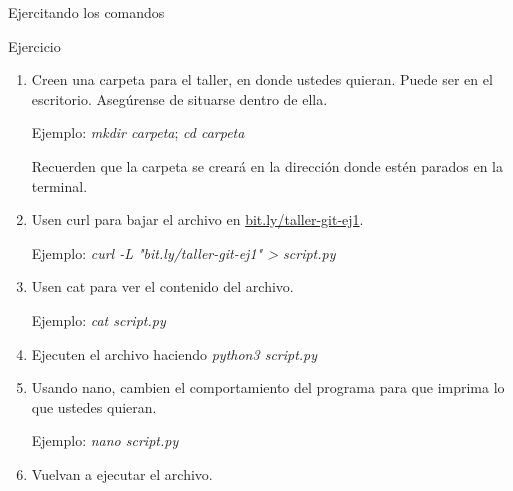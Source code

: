 \begin{frame}{Ejercitando los comandos}

\begin{ejercicio}{Ejercicio}
    \begin{enumerate}
        \item Creen una carpeta para el taller, en donde ustedes quieran. Puede ser en el escritorio. Asegúrense de situarse dentro de ella.
        
        Ejemplo: \textit{mkdir carpeta};
        \textit{cd carpeta}
        
        Recuerden que la carpeta se creará en la dirección donde estén parados en la terminal. 
        \pause
        \item Usen curl para bajar el archivo en \href{https://bit.ly/taller-git-ej1}{bit.ly/taller-git-ej1}. 
        
        Ejemplo: \textit{curl -L "bit.ly/taller-git-ej1" > script.py}
        \pause
        \item Usen cat para ver el contenido del archivo. 
        
        Ejemplo: \textit{cat script.py}
        \pause
        \item Ejecuten el archivo haciendo \textit{python3 script.py}
        \pause
        \item Usando nano, cambien el comportamiento del programa para que imprima lo que ustedes quieran. 
        
        Ejemplo: \textit{nano script.py}
        \pause
        \item Vuelvan a ejecutar el archivo.
    \end{enumerate}
\end{ejercicio}
\end{frame}
